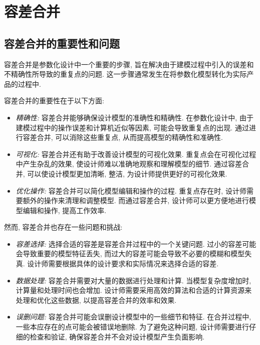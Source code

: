 
\section{容差合并}

\def\naive{\codeinline{python}{Naive}}
\def\treed{\codeinline{csharp}{Tree3d}}
\def\kdtree{\codeinline{python}{k-d Tree}}

\subsection{容差合并的重要性和问题}

容差合并是参数化设计中一个重要的步骤, 旨在解决由于建模过程中引入的误差和不精确性所导致的重复点的问题.
这一步骤通常发生在将参数化模型转化为实际产品的过程中.

容差合并的重要性在于以下方面:
\begin{itemize}
  \item \emph{精确性:} 容差合并能够确保设计模型的准确性和精确性.
        在参数化设计中, 由于建模过程中的操作误差和计算机近似等因素, 可能会导致重复点的出现.
        通过进行容差合并, 可以消除这些重复点, 从而提高模型的精确性和准确性.
  \item \emph{可视化:} 容差合并还有助于改善设计模型的可视化效果.
        重复点会在可视化过程中产生杂乱的效果, 使设计师难以准确地观察和理解模型的细节.
        通过容差合并, 可以使设计模型更加清晰, 整洁, 为设计师提供更好的可视化效果.
  \item \emph{优化操作:} 容差合并可以简化模型编辑和操作的过程.
        重复点存在时, 设计师需要额外的操作来清理和调整模型.
        而通过容差合并, 设计师可以更方便地进行模型编辑和操作, 提高工作效率.
\end{itemize}

然而, 容差合并也存在一些问题和挑战:
\begin{itemize}
  \item \emph{容差选择:} 选择合适的容差是容差合并过程中的一个关键问题.
        过小的容差可能会导致重要的模型特征丢失, 而过大的容差可能会导致不必要的模糊和模型失真.
        设计师需要根据具体的设计要求和实际情况来选择合适的容差.
  \item \emph{数据处理:} 容差合并需要对大量的数据进行处理和计算.
        当模型复杂度增加时, 计算量和处理时间也会增加.
        设计师需要采用高效的算法和合适的计算资源来处理和优化这些数据, 以提高容差合并的效率和效果.
  \item \emph{误删问题:} 容差合并可能会误删设计模型中的一些细节和特征.
        在合并过程中, 一些本应存在的点可能会被错误地删除.
        为了避免这种问题, 设计师需要进行仔细的检查和验证, 确保容差合并不会对设计模型产生负面影响.
\end{itemize}

